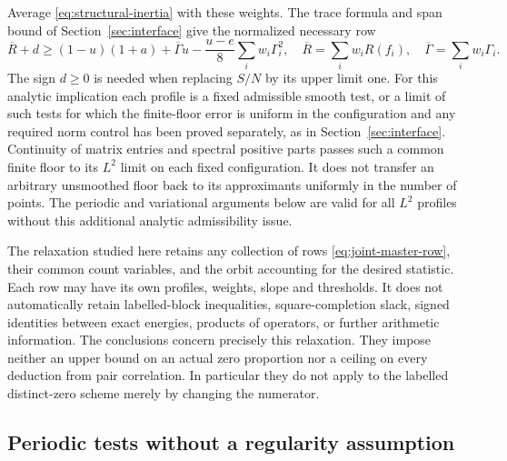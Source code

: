 \documentclass[11pt,reqno]{amsart}
\numberwithin{equation}{section}
\begin{document}
Average \eqref{eq:structural-inertia} with these weights.
The trace formula and span bound of Section~\ref{sec:interface}
give the normalized necessary row
\begin{equation}
 \overline R+d\ge
 (1-u)(1+a)+\overline\Gamma u
 -\frac{u-e}{8}\sum_iw_i\Gamma_i^2,
 \quad
 \overline R=\sum_iw_iR(f_i),\quad
 \overline\Gamma=\sum_iw_i\Gamma_i.
 \label{eq:joint-master-row}
\end{equation}
The sign $d\ge0$ is needed when replacing $S/N$ by its upper limit
one. For this analytic implication each profile is a fixed admissible
smooth test, or a limit of such tests for which the finite-floor
error is uniform in the configuration and any required norm control
has been proved separately, as in Section~\ref{sec:interface}.
Continuity of matrix entries and spectral positive parts passes
such a common finite floor to its $L^2$ limit on each fixed
configuration. It does not transfer an arbitrary unsmoothed floor
back to its approximants uniformly in the number of points.
The periodic and variational arguments below are valid for all
$L^2$ profiles without this additional analytic admissibility issue.

The relaxation studied here retains any collection of rows
\eqref{eq:joint-master-row}, their common count variables, and the
orbit accounting for the desired statistic. Each row may have its
own profiles, weights, slope and thresholds. It does not automatically
retain labelled-block inequalities, square-completion slack, signed
identities between exact energies, products of operators, or further
arithmetic information. The conclusions concern precisely this
relaxation. They impose neither an upper bound on an actual
zero proportion nor a ceiling on every deduction from pair correlation.
In particular they do not apply to the labelled distinct-zero scheme
merely by changing the numerator.

\subsection{Periodic tests without a regularity assumption}
\end{document}
